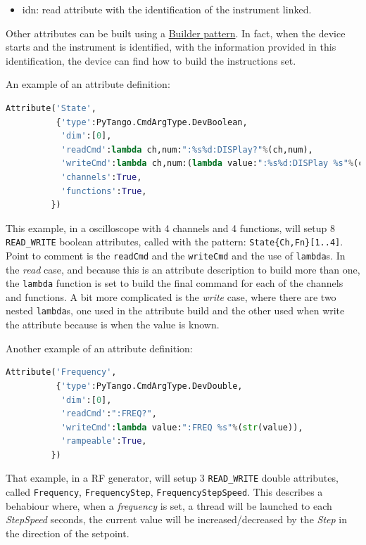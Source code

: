 \documentclass[a4paper,10pt]{article}
\begin{document}
\begin{itemize}
    \item idn: read attribute with the identification of the instrument linked.
\end{itemize}

Other attributes can be built using a \href{http://en.wikipedia.org/wiki/Builder_pattern}{Builder pattern}. In fact, when the device starts and the instrument is identified, with the information provided in this identification, the device can find how to build the instructions set.

An example of an attribute definition:

\begin{lstlisting}[language=python,basicstyle=\footnotesize]
Attribute('State',
          {'type':PyTango.CmdArgType.DevBoolean,
           'dim':[0],
           'readCmd':lambda ch,num:":%s%d:DISPlay?"%(ch,num),
           'writeCmd':lambda ch,num:(lambda value:":%s%d:DISPlay %s"%(ch,num,value)),
           'channels':True,
           'functions':True,
         })
\end{lstlisting}

This example, in a oscilloscope with 4 channels and 4 functions, will setup 8 {\tt READ\_WRITE} boolean attributes, called with the pattern: {\tt State\{Ch,Fn\}[1..4]}. Point to comment is the {\tt readCmd} and the {\tt writeCmd} and the use of {\tt lambda}s. In the \emph{read} case, and because this is an attribute description to build more than one, the {\tt lambda} function is set to build the final command for each of the channels and functions. A bit more complicated is the \emph{write} case, where there are two nested {\tt lambda}s, one used in the attribute build and the other used when write the attribute because is when the value is known.

Another example of an attribute definition:

\begin{lstlisting}[language=python,basicstyle=\footnotesize]
Attribute('Frequency',
          {'type':PyTango.CmdArgType.DevDouble,
           'dim':[0],
           'readCmd':":FREQ?",
           'writeCmd':lambda value:":FREQ %s"%(str(value)),
           'rampeable':True,
         })
\end{lstlisting}

That example, in a RF generator, will setup 3 {\tt READ\_WRITE} double attributes, called {\tt Frequency}, {\tt FrequencyStep}, {\tt FrequencyStepSpeed}. This describes a behabiour where, when a \emph{frequency} is set, a thread will be launched to each \emph{StepSpeed} seconds, the current value will be increased/decreased by the \emph{Step} in the direction of the setpoint.
\end{document}
